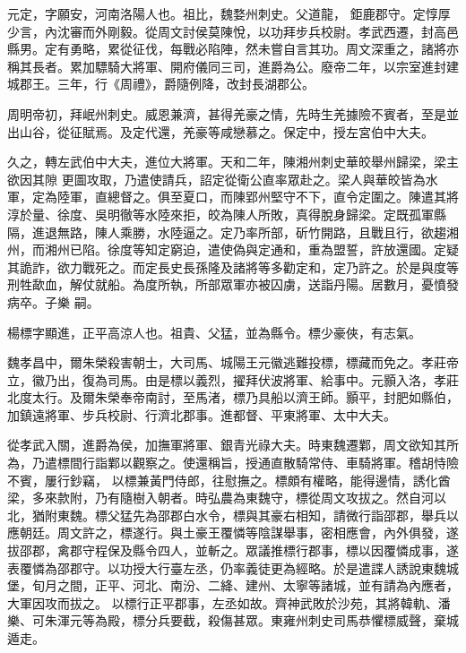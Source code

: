 \begin{pinyinscope}
 元定，字願安，河南洛陽人也。祖比，魏婺州刺史。父道龍，
 鉅鹿郡守。定惇厚少言，內沈審而外剛毅。從周文討侯莫陳悅，以功拜步兵校尉。孝武西遷，封高邑縣男。定有勇略，累從征伐，每戰必陷陣，然未嘗自言其功。周文深重之，諸將亦稱其長者。累加驃騎大將軍、開府儀同三司，進爵為公。廢帝二年，以宗室進封建城郡王。三年，行《周禮》，爵隨例降，改封長湖郡公。



 周明帝初，拜岷州刺史。威恩兼濟，甚得羌豪之情，先時生羌據險不賓者，至是並出山谷，從征賦焉。及定代還，羌豪等咸戀慕之。保定中，授左宮伯中大夫。



 久之，轉左武伯中大夫，進位大將軍。天和二年，陳湘州刺史華皎舉州歸梁，梁主欲因其隙
 更圖攻取，乃遣使請兵，詔定從衛公直率眾赴之。梁人與華皎皆為水軍，定為陸軍，直總督之。俱至夏口，而陳郢州堅守不下，直令定圍之。陳遣其將淳於量、徐度、吳明徹等水陸來拒，皎為陳人所敗，真得脫身歸梁。定既孤軍縣隔，進退無路，陳人乘勝，水陸逼之。定乃率所部，斫竹開路，且戰且行，欲趨湘州，而湘州已陷。徐度等知定窮迫，遣使偽與定通和，重為盟誓，許放還國。定疑其詭詐，欲力戰死之。而定長史長孫隆及諸將等多勸定和，定乃許之。於是與度等刑牲歃血，解仗就船。為度所執，所部眾軍亦被囚虜，送詣丹陽。居數月，憂憤發病卒。子樂
 嗣。



 楊標字顯進，正平高涼人也。祖貴、父猛，並為縣令。標少豪俠，有志氣。



 魏孝昌中，爾朱榮殺害朝士，大司馬、城陽王元徽逃難投標，標藏而免之。孝莊帝立，徽乃出，復為司馬。由是標以義烈，擢拜伏波將軍、給事中。元顥入洛，孝莊北度太行。及爾朱榮奉帝南討，至馬渚，標乃具船以濟王師。顥平，封肥如縣伯，加鎮遠將軍、步兵校尉、行濟北郡事。進都督、平東將軍、太中大夫。



 從孝武入關，進爵為侯，加撫軍將軍、銀青光祿大夫。時東魏遷鄴，周文欲知其所為，乃遣標間行詣鄴以觀察之。使還稱旨，授通直散騎常侍、車騎將軍。稽胡恃險不賓，屢行鈔竊，
 以標兼黃門侍郎，往慰撫之。標頗有權略，能得邊情，誘化酋梁，多來款附，乃有隨樹入朝者。時弘農為東魏守，標從周文攻拔之。然自河以北，猶附東魏。標父猛先為邵郡白水令，標與其豪右相知，請微行詣邵郡，舉兵以應朝廷。周文許之，標遂行。與土豪王覆憐等陰謀舉事，密相應會，內外俱發，遂拔邵郡，禽郡守程保及縣令四人，並斬之。眾議推標行郡事，標以因覆憐成事，遂表覆憐為邵郡守。以功授大行臺左丞，仍率義徒更為經略。於是遣諜人誘說東魏城堡，旬月之間，正平、河北、南汾、二絳、建州、太寧等諸城，並有請為內應者，大軍因攻而拔之。
 以標行正平郡事，左丞如故。齊神武敗於沙苑，其將韓軌、潘樂、可朱渾元等為殿，標分兵要截，殺傷甚眾。東雍州刺史司馬恭懼標威聲，棄城遁走。




\end{pinyinscope}
